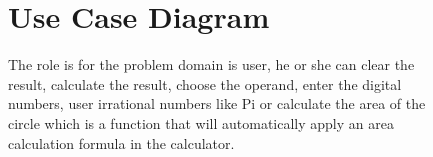 \documentclass[12pt]{report}
\begin{document}
{\begin{figure}[h!]
	\end{figure}
	

	


	\begin{figure}[h!]
	\section{Use Case Diagram}
		The role is for the problem domain is user, he or she can clear the result, calculate the result, choose the operand, enter the digital numbers, user irrational numbers like Pi or calculate the area of the circle which is a function that will automatically apply an area calculation formula in the calculator.
	\begin{itemize}



\end{itemize}
\end{figure}}
\end{document}
